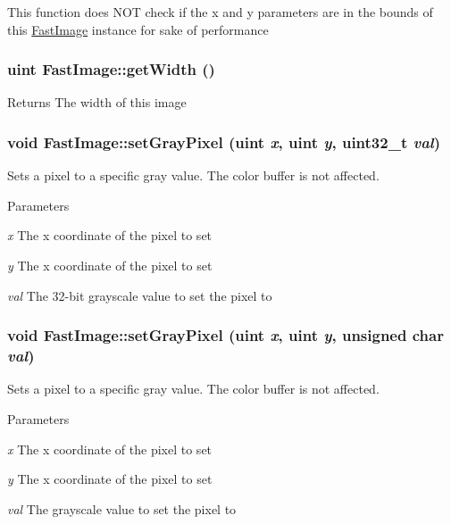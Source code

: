 This function does NOT check if the x and y parameters are in the bounds of this \hyperlink{class_fast_image}{FastImage} instance for sake of performance \hypertarget{class_fast_image_a94290d65ff847f0a7e56ac8050133313}{
\subsubsection[{getWidth}]{\setlength{\rightskip}{0pt plus 5cm}uint FastImage::getWidth ()}}
\label{class_fast_image_a94290d65ff847f0a7e56ac8050133313}
\begin{DoxyReturn}{Returns}
The width of this image 
\end{DoxyReturn}
\hypertarget{class_fast_image_a018ae53445320129fa129b80e805842c}{
\subsubsection[{setGrayPixel}]{\setlength{\rightskip}{0pt plus 5cm}void FastImage::setGrayPixel (uint {\em x}, \/  uint {\em y}, \/  uint32\_\-t {\em val})}}
\label{class_fast_image_a018ae53445320129fa129b80e805842c}
Sets a pixel to a specific gray value. The color buffer is not affected. 
\begin{DoxyParams}{Parameters}
\item[{\em x}]The x coordinate of the pixel to set \item[{\em y}]The x coordinate of the pixel to set \item[{\em val}]The 32-\/bit grayscale value to set the pixel to \end{DoxyParams}
\hypertarget{class_fast_image_a1e0ef4ac5b61cc6d96c9cd9c4bada344}{
\subsubsection[{setGrayPixel}]{\setlength{\rightskip}{0pt plus 5cm}void FastImage::setGrayPixel (uint {\em x}, \/  uint {\em y}, \/  unsigned char {\em val})}}
\label{class_fast_image_a1e0ef4ac5b61cc6d96c9cd9c4bada344}
Sets a pixel to a specific gray value. The color buffer is not affected. 
\begin{DoxyParams}{Parameters}
\item[{\em x}]The x coordinate of the pixel to set \item[{\em y}]The x coordinate of the pixel to set \item[{\em val}]The grayscale value to set the pixel to \end{DoxyParams}


